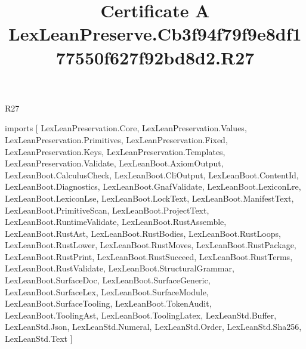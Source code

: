 \begin{lexlean}{R27}
\title{Certificate A LexLeanPreserve.Cb3f94f79f9e8df177550f627f92bd8d2.R27}
\begin{coremodule}
imports [
  LexLeanPreservation.Core,
  LexLeanPreservation.Values,
  LexLeanPreservation.Primitives,
  LexLeanPreservation.Fixed,
  LexLeanPreservation.Keys,
  LexLeanPreservation.Templates,
  LexLeanPreservation.Validate,
  LexLeanBoot.AxiomOutput,
  LexLeanBoot.CalculusCheck,
  LexLeanBoot.CliOutput,
  LexLeanBoot.ContentId,
  LexLeanBoot.Diagnostics,
  LexLeanBoot.GnafValidate,
  LexLeanBoot.LexiconLre,
  LexLeanBoot.LexiconLse,
  LexLeanBoot.LockText,
  LexLeanBoot.ManifestText,
  LexLeanBoot.PrimitiveScan,
  LexLeanBoot.ProjectText,
  LexLeanBoot.RuntimeValidate,
  LexLeanBoot.RustAssemble,
  LexLeanBoot.RustAst,
  LexLeanBoot.RustBodies,
  LexLeanBoot.RustLoops,
  LexLeanBoot.RustLower,
  LexLeanBoot.RustMoves,
  LexLeanBoot.RustPackage,
  LexLeanBoot.RustPrint,
  LexLeanBoot.RustSucceed,
  LexLeanBoot.RustTerms,
  LexLeanBoot.RustValidate,
  LexLeanBoot.StructuralGrammar,
  LexLeanBoot.SurfaceDoc,
  LexLeanBoot.SurfaceGeneric,
  LexLeanBoot.SurfaceLex,
  LexLeanBoot.SurfaceModule,
  LexLeanBoot.SurfaceTooling,
  LexLeanBoot.TokenAudit,
  LexLeanBoot.ToolingAst,
  LexLeanBoot.ToolingLatex,
  LexLeanStd.Buffer,
  LexLeanStd.Json,
  LexLeanStd.Numeral,
  LexLeanStd.Order,
  LexLeanStd.Sha256,
  LexLeanStd.Text
]


\end{coremodule}
\end{lexlean}
